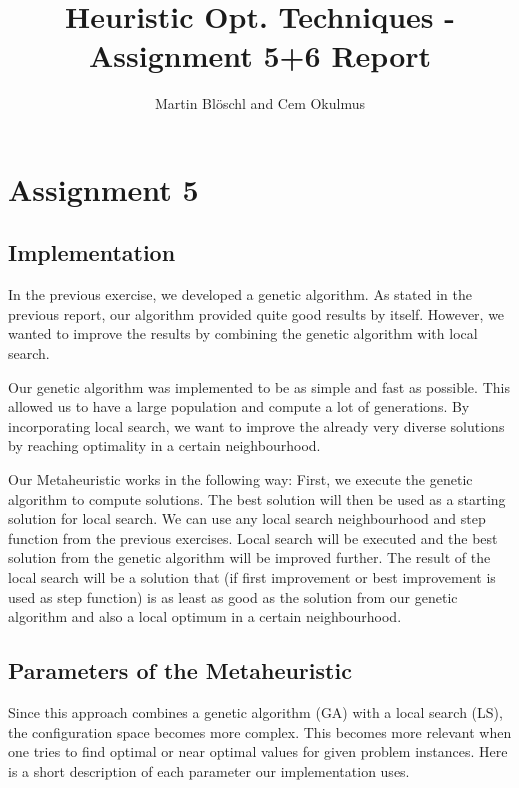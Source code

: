 \documentclass [11pt]{article}
\begin{document}
\title{ Heuristic Opt. Techniques - Assignment 5+6 Report}
\author{ Martin Blöschl and Cem Okulmus }

\maketitle
\thispagestyle{empty}


\section{Assignment 5}


\subsection{Implementation}

In the previous exercise, we developed a genetic algorithm. As stated in the previous report, our algorithm provided quite good results by itself. However, we wanted to improve the results by combining the genetic algorithm with local search.

Our genetic algorithm was implemented to be as simple and fast as possible. This allowed us to have a large population and compute a lot of generations. By incorporating local search, we want to improve the already very diverse solutions by reaching optimality in a certain neighbourhood.

Our Metaheuristic works in the following way: First, we execute the genetic algorithm to compute solutions. The best solution will then be used as a starting solution for local search. We can use any local search neighbourhood and step function from the previous exercises. Local search will be executed and the best solution from the genetic algorithm will be improved further. The result of the local search will  be a solution that (if first improvement or best improvement is used as step function) is as least as good as the solution from our genetic algorithm and also a local optimum in a certain neighbourhood.

\subsection{Parameters of the Metaheuristic}

Since this approach combines a genetic algorithm (GA) with a local search (LS), the configuration space becomes more complex. This becomes more relevant when one tries to find optimal or near optimal values for given problem instances. Here is a short description of each parameter our implementation uses. 
\end{document}
